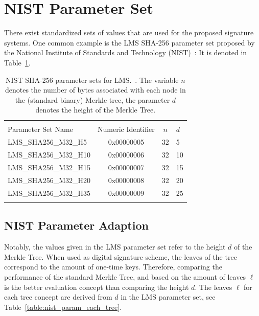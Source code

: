 \section{NIST Parameter Set}
There exist standardized sets of values that are used for the proposed signature systems. One common example is the LMS SHA-256 parameter set proposed by the National Institute of Standards and Technology (NIST)~\cite{stateful_hashbased_sign_schemes_NIST_2020}: It is denoted in Table~\ref{table:nist_param_lms}. 

\begin{table}
\centering
\begin{tabular}{l c c l} 
 \hline\noalign{\smallskip}
 \multicolumn{4}{c}{\textbf{NIST Parameter Set, LMS}} \\
 Parameter Set Name & Numeric Identifier & $n$ & $d$\\
 \hline\noalign{\smallskip}
 LMS\_SHA256\_M32\_H5 & 0x00000005  & 32 & 5 \\
 LMS\_SHA256\_M32\_H10 & 0x00000006  & 32 & 10 \\
 LMS\_SHA256\_M32\_H15 & 0x00000007  & 32 & 15 \\
 LMS\_SHA256\_M32\_H20 & 0x00000008  & 32 & 20 \\
 LMS\_SHA256\_M32\_H35 & 0x00000009  & 32 & 25 \\
 \hline\noalign{\smallskip}
 \end{tabular}
\caption{NIST SHA-256 parameter sets for LMS.~\cite{stateful_hashbased_sign_schemes_NIST_2020}. The variable $n$ denotes the number of bytes associated with each node in the (standard binary) Merkle tree, the parameter $d$ denotes the height of the Merkle Tree.}
\label{table:nist_param_lms}
\end{table}

\subsection{NIST Parameter Adaption}
\label{sec:nist_param_to_leaves}
Notably, the values given in the LMS parameter set refer to the height $d$ of the Merkle Tree. When used as digital signature scheme, the leaves of the tree correspond to the amount of one-time keys. Therefore, comparing the performance of the standard Merkle Tree, \tftree and \extree based on the amount of leaves $\ell$ is the better evaluation concept than comparing the height $d$. 
The leaves $\ell$ for each tree concept are derived from $d$ in the LMS parameter set, see Table~\ref{table:nist_param_each_tree}. 

